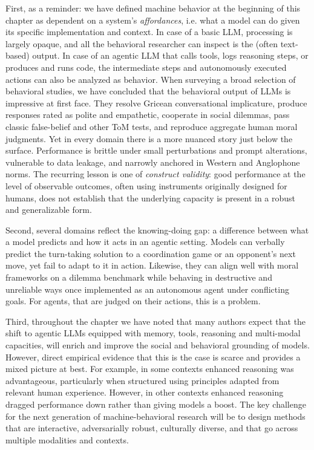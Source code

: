 First, as a reminder: we have defined machine behavior at the beginning of this chapter as dependent on a system's \emph{affordances}, i.e. what a model can do given its specific implementation and context. In case of a basic LLM, processing is largely opaque, and all the behavioral researcher can inspect is the (often text-based) output. In case of an agentic LLM that calls tools, logs reasoning steps, or produces and runs code, the intermediate steps and autonomously executed actions can also be analyzed as behavior. When surveying a broad selection of behavioral studies, we have concluded that the behavioral output of LLMs is impressive at first face. They resolve Gricean conversational implicature, produce responses rated as polite and empathetic, cooperate in social dilemmas, pass classic false-belief and other ToM tests, and reproduce aggregate human moral judgments. Yet in every domain there is a more nuanced story just below the surface. Performance is brittle under small perturbations and prompt alterations, vulnerable to data leakage, and narrowly anchored in Western and Anglophone norms. The recurring lesson is one of \emph{construct validity}: good performance at the level of observable outcomes, often using instruments originally designed for humans, does not establish that the underlying capacity is present in a robust and generalizable form.

Second, several domains reflect the knowing-doing gap: a difference between what a model predicts and how it acts in an agentic setting. Models can verbally predict the turn-taking solution to a coordination game or an opponent's next move, yet fail to adapt to it in action. Likewise, they can align well with moral frameworks on a dilemma benchmark while behaving in destructive and unreliable ways once implemented as an autonomous agent under conflicting goals. For agents, that are judged on their actions, this is a problem.

Third, throughout the chapter we have noted that many authors expect that the shift to agentic LLMs equipped with memory, tools, reasoning and multi-modal capacities, will enrich and improve the social and behavioral grounding of models. However, direct empirical evidence that this is the case is scarce and provides a mixed picture at best. For example, in some contexts enhanced reasoning was advantageous, particularly when structured using principles adapted from relevant human experience. However, in other contexts enhanced reasoning dragged performance down rather than giving models a boost. The key challenge for the next generation of machine-behavioral research will be to design methods that are interactive, adversarially robust, culturally diverse, and that go across multiple modalities and contexts. 




